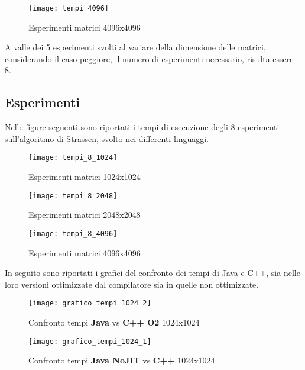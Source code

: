 \begin{figure}[!htbp]
  \texttt{[image: tempi\_4096]}
  \caption{Esperimenti matrici 4096x4096}
  \label{tempi_4096}
\end{figure}

\clearpage

A valle dei 5 esperimenti svolti al variare della dimensione delle matrici,
considerando il caso peggiore, il numero di esperimenti necessario,
risulta essere 8.\\

\subsection{Esperimenti}

Nelle figure seguenti sono riportati i tempi di esecuzione degli 8 esperimenti
sull'algoritmo di Strassen, svolto nei differenti linguaggi.\\

\begin{figure}[!htbp]
  \texttt{[image: tempi\_8\_1024]}
  \caption{Esperimenti matrici 1024x1024}
  \label{tempi_8_1024}
\end{figure}

\begin{figure}[!htbp]
  \texttt{[image: tempi\_8\_2048]}
  \caption{Esperimenti matrici 2048x2048}
  \label{tempi_8_2048}
\end{figure}

\begin{figure}[!htbp]
  \texttt{[image: tempi\_8\_4096]}
  \caption{Esperimenti matrici 4096x4096}
  \label{tempi_8_4096}
\end{figure}

\clearpage

In seguito sono riportati i grafici del confronto dei tempi di Java e C++, sia
nelle loro versioni ottimizzate dal compilatore sia in quelle non ottimizzate.\\

\begin{figure}[!htbp]
  \texttt{[image: grafico\_tempi\_1024\_2]}
  \caption{Confronto tempi \textbf{Java} vs \textbf{C++ O2} 1024x1024}
  \label{grafico_tempi_1024_2}
\end{figure}

\begin{figure}[!htbp]
  \texttt{[image: grafico\_tempi\_1024\_1]}
  \caption{Confronto tempi \textbf{Java NoJIT} vs \textbf{C++} 1024x1024}
  \label{grafico_tempi_1024_1}
\end{figure}

